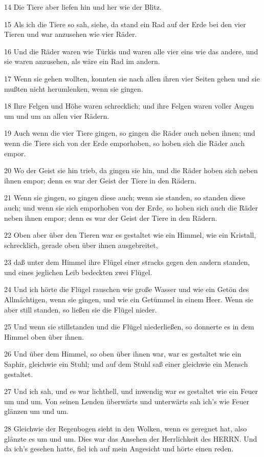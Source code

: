 \par 14 Die Tiere aber liefen hin und her wie der Blitz.
\par 15 Als ich die Tiere so sah, siehe, da stand ein Rad auf der Erde bei den vier Tieren und war anzusehen wie vier Räder.
\par 16 Und die Räder waren wie Türkis und waren alle vier eins wie das andere, und sie waren anzusehen, als wäre ein Rad im andern.
\par 17 Wenn sie gehen wollten, konnten sie nach allen ihren vier Seiten gehen und sie mußten nicht herumlenken, wenn sie gingen.
\par 18 Ihre Felgen und Höhe waren schrecklich; und ihre Felgen waren voller Augen um und um an allen vier Rädern.
\par 19 Auch wenn die vier Tiere gingen, so gingen die Räder auch neben ihnen; und wenn die Tiere sich von der Erde emporhoben, so hoben sich die Räder auch empor.
\par 20 Wo der Geist sie hin trieb, da gingen sie hin, und die Räder hoben sich neben ihnen empor; denn es war der Geist der Tiere in den Rädern.
\par 21 Wenn sie gingen, so gingen diese auch; wenn sie standen, so standen diese auch; und wenn sie sich emporhoben von der Erde, so hoben sich auch die Räder neben ihnen empor; denn es war der Geist der Tiere in den Rädern.
\par 22 Oben aber über den Tieren war es gestaltet wie ein Himmel, wie ein Kristall, schrecklich, gerade oben über ihnen ausgebreitet,
\par 23 daß unter dem Himmel ihre Flügel einer stracks gegen den andern standen, und eines jeglichen Leib bedeckten zwei Flügel.
\par 24 Und ich hörte die Flügel rauschen wie große Wasser und wie ein Getön des Allmächtigen, wenn sie gingen, und wie ein Getümmel in einem Heer. Wenn sie aber still standen, so ließen sie die Flügel nieder.
\par 25 Und wenn sie stillstanden und die Flügel niederließen, so donnerte es in dem Himmel oben über ihnen.
\par 26 Und über dem Himmel, so oben über ihnen war, war es gestaltet wie ein Saphir, gleichwie ein Stuhl; und auf dem Stuhl saß einer gleichwie ein Mensch gestaltet.
\par 27 Und ich sah, und es war lichthell, und inwendig war es gestaltet wie ein Feuer um und um. Von seinen Lenden überwärts und unterwärts sah ich's wie Feuer glänzen um und um.
\par 28 Gleichwie der Regenbogen sieht in den Wolken, wenn es geregnet hat, also glänzte es um und um. Dies war das Ansehen der Herrlichkeit des HERRN. Und da ich's gesehen hatte, fiel ich auf mein Angesicht und hörte einen reden.


